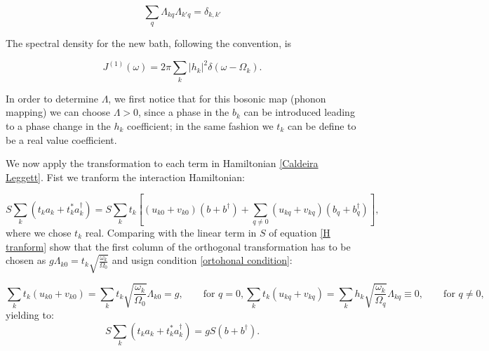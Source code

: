 \documentclass[%
preprint,
onecolumn,
notitlepag,
 amsmath,amssymb,
 aps,
 pra,
]{revtex4-2}
\providecommand{\abs}[1]{\lvert#1\rvert}
\begin{document}
\begin{itemize}
\begin{equation}
    \sum_q \Lambda_{kq} \Lambda_{k'q} = \delta_{k,k'}
    \label{ortohonal condition}
\end{equation}



The spectral density for the new bath, following the convention, is

\begin{equation}
    J^{(1)} (\omega) = 2\pi \sum_k \abs{h_k}^2 \delta (\omega- \Omega_k).
\end{equation}

In order to determine $\Lambda$, we first notice that for this bosonic map (phonon mapping) we can choose $\Lambda > 0 $, since a phase in the $b_k$ can be introduced leading to a phase change in the $h_k$ coefficient; in the same fashion we $t_k$ can be define to be a real value coefficient.

We now apply the transformation to each term in Hamiltonian \eqref{Caldeira Leggett}. Fist we tranform the interaction Hamiltonian: 

\begin{equation}
    S \sum_k \left( t_k a_k + t_k ^*a_k^{\dagger} \right) =  S \sum_k t_{k} \left[ (u_{k0} + v_{k0}) (b + b^{\dagger}) +\sum_{q\neq 0} (u_{kq} + v_{kq}) (b_{q} + b_{q}^{\dagger}) \right],
\end{equation}
where we chose $t_{k}$ real. Comparing with the linear term in $S$ of equation \eqref{H tranform}
 show that the first column of the orthogonal transformation has to be chosen as $ g \Lambda_{k 0}=t_{k} \sqrt{\frac{\omega_{k}}{\Omega_{0}}}$ and usign condition \eqref{ortohonal condition}:   


\begin{subequations}
\begin{equation}
    \sum_{k} t_{k} (u_{k0} + v_{k0}) = \sum_{k} t_{k} \sqrt{\frac{\omega_{k}}{\Omega_{0}}} \Lambda_{k0} =  g, \qquad \text{for } q=0,
\end{equation}
\begin{equation}
    \sum_{k} t_{k} (u_{kq} + v_{kq}) = \sum_{k} h_{k} \sqrt{\frac{\omega_{k}}{\Omega_{q}}} \Lambda_{kq} \equiv 0, \qquad \text{for } q\neq 0,
\end{equation}
\end{subequations}
yielding  to: 
\begin{equation}
    S \sum_k \left( t_k a_k + t_k ^*a_k^{\dagger} \right) = g  S  (b + b^{\dagger}).
\end{equation}








\end{itemize}
\end{document}
